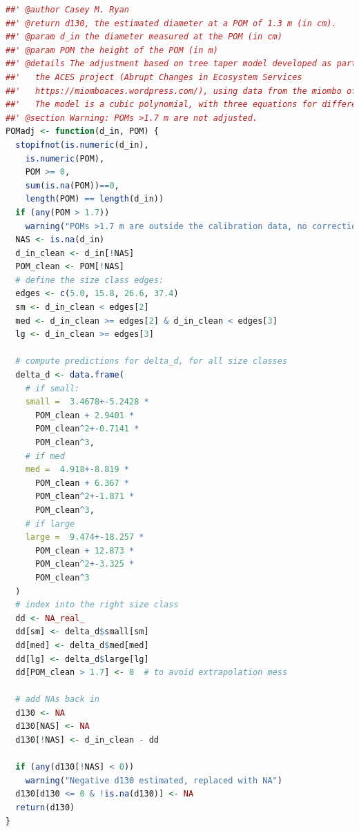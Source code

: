 \documentclass[diversity,article,submit,moreauthors,pdftex]{Definitions/mdpi}
\begin{document}
\begin{lstlisting}[language=R]
##' @author Casey M. Ryan
##' @return d130, the estimated diameter at a POM of 1.3 m (in cm). 
##' @param d_in the diameter measured at the POM (in cm)
##' @param POM the height of the POM (in m)
##' @details The adjustment based on tree taper model developed as part of 
##'   the ACES project (Abrupt Changes in Ecosystem Services 
##'   https://miomboaces.wordpress.com/), using data from the miombo of Niassa. 
##'   The model is a cubic polynomial, with three equations for different sized stems. 
##' @section Warning: POMs >1.7 m are not adjusted.
POMadj <- function(d_in, POM) {
  stopifnot(is.numeric(d_in),
    is.numeric(POM),
    POM >= 0,
    sum(is.na(POM))==0,
    length(POM) == length(d_in))
  if (any(POM > 1.7))
    warning("POMs >1.7 m are outside the calibration data, no correction applied") 
  NAS <- is.na(d_in)
  d_in_clean <- d_in[!NAS]
  POM_clean <- POM[!NAS]
  # define the size class edges:
  edges <- c(5.0, 15.8, 26.6, 37.4)
  sm <- d_in_clean < edges[2]
  med <- d_in_clean >= edges[2] & d_in_clean < edges[3]
  lg <- d_in_clean >= edges[3]
  
  # compute predictions for delta_d, for all size classes
  delta_d <- data.frame(
    # if small:
    small =  3.4678+-5.2428 * 
   	  POM_clean + 2.9401 * 
      POM_clean^2+-0.7141 * 
      POM_clean^3,
    # if med
    med =  4.918+-8.819 * 
      POM_clean + 6.367 * 
      POM_clean^2+-1.871 * 
      POM_clean^3,
    # if large
    large =  9.474+-18.257 * 
      POM_clean + 12.873 * 
      POM_clean^2+-3.325 * 
      POM_clean^3
  )
  # index into the right size class
  dd <- NA_real_
  dd[sm] <- delta_d$small[sm]
  dd[med] <- delta_d$med[med]
  dd[lg] <- delta_d$large[lg]
  dd[POM_clean > 1.7] <- 0  # to avoid extrapolation mess
  
  # add NAs back in
  d130 <- NA
  d130[NAS] <- NA
  d130[!NAS] <- d_in_clean - dd
  
  if (any(d130[!NAS] < 0))
    warning("Negative d130 estimated, replaced with NA")
  d130[d130 <= 0 & !is.na(d130)] <- NA
  return(d130)
}
\end{lstlisting}

\end{document}
